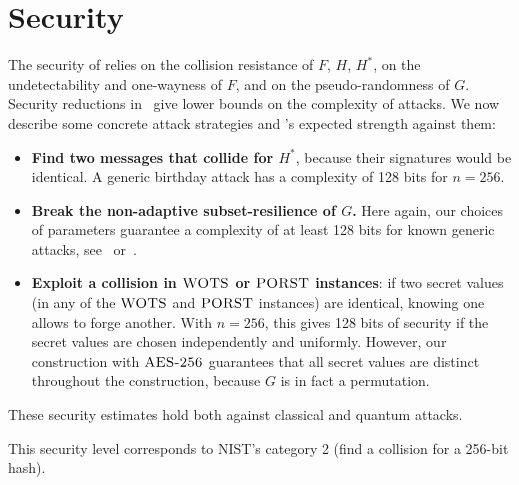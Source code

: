 \chapter{Security}\label{chap:security}

The security of \gravity{} relies on the collision resistance of $F$, $H$, $H^*$, on the undetectability and one-wayness of $F$, and on the pseudo-randomness of $G$.
Security reductions in~\cite[Ch.6]{masters} give lower bounds on the complexity of attacks.
We now describe some concrete attack strategies and \gravity's expected strength against them:

\begin{itemize}

\item \textbf{Find two messages that collide for $H^*$}, because their signatures would be identical.
A generic birthday attack has a complexity of 128 bits for $n=256$.

\item \textbf{Break the non-adaptive subset-resilience of $G$.}
Here again, our choices of parameters guarantee a complexity of at least 128 bits for known generic attacks, see~\cite{subsetres} or~\cite[Ch.4]{masters}. 

\item \textbf{Exploit a collision in $\textsc{WOTS}$ or $\textsc{PORST}$ instances}: if two secret values (in any of the $\textsc{WOTS}$ and $\textsc{PORST}$ instances) are identical, knowing one allows to forge another.
With $n=256$, this gives 128 bits of security if the secret values are chosen independently and uniformly.
However, our construction with $\textsc{AES-256}$ guarantees that all secret values are distinct throughout the construction, because $G$ is in fact a permutation.

\end{itemize}
These security estimates hold both against classical and quantum attacks.

This security level corresponds to NIST's category 2 (find a collision for a 256-bit hash).




